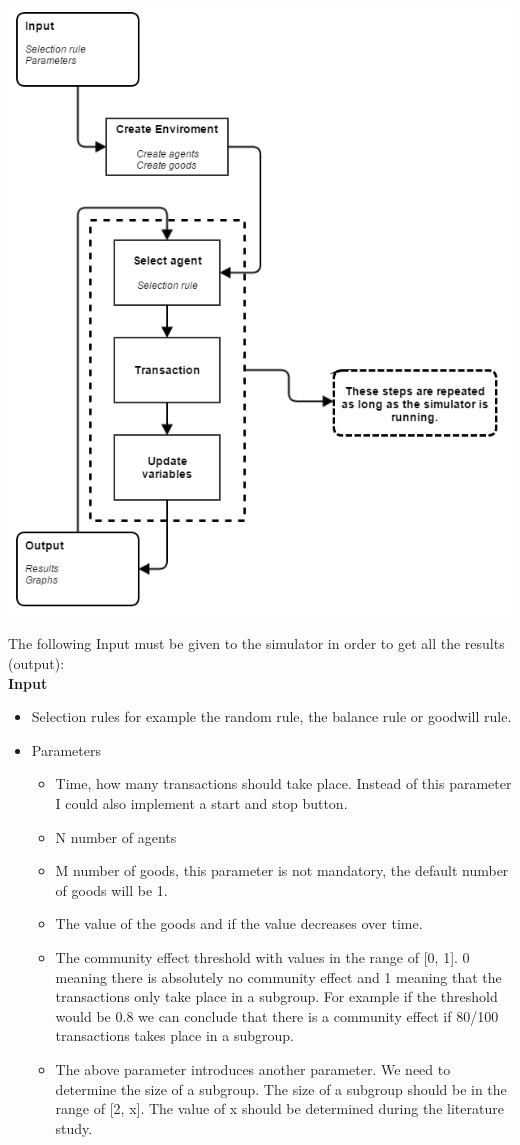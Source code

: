 \documentclass{article}
\begin{document}
\includegraphics[scale=0.70]{Simulatorproces}


The following Input must be given to the simulator in order to get all the results (output): 
\\
\textbf{Input}

\begin{itemize}
  \item Selection rules for example the random rule, the balance rule or goodwill rule.
  \item Parameters
	\begin{itemize}
 		 \item Time, how many transactions should take place. Instead of this parameter I could also implement a start and stop button.
  		\item N number of agents
  		\item M number of goods, this parameter is not mandatory, the default number of goods will be 1.
		\item The value of the goods and if the value decreases over time.
		\item The community effect threshold with values in the range of [0, 1]. 0 meaning there is absolutely no community effect and 1 meaning that the transactions only take place in a subgroup. For example if the threshold would be 0.8 we can conclude that there is a community effect if 80/100 transactions takes place in a subgroup.
		\item The above parameter introduces another parameter. We need to determine the size of a subgroup. The size of a subgroup should be in the range of [2, x]. The value of x should be determined during the literature study.
	\end{itemize} 
\end{itemize}
\end{document}
